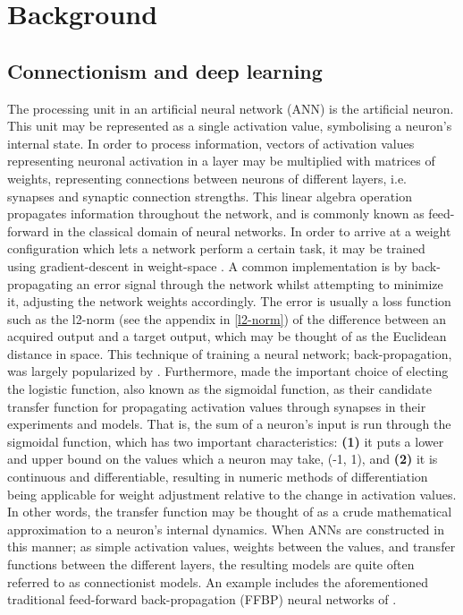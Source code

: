 
\chapter{Background}\label{chpt:background}

\section{Connectionism and deep learning}
The processing unit in an artificial neural network (ANN) is the artificial neuron. This unit may be represented as a single activation value, symbolising a neuron's internal state. In order to process information, vectors of activation values representing neuronal activation in a layer may be multiplied with matrices of weights, representing connections between neurons of different layers, i.e. synapses and synaptic connection strengths. This linear algebra operation propagates information throughout the network, and is commonly known as feed-forward in the classical domain of neural networks. In order to arrive at a weight configuration which lets a network perform a certain task, it may be trained using gradient-descent in weight-space \citep{Hinton1989}. A common implementation is by  back-propagating an error signal through the network whilst attempting to minimize it, adjusting the network weights accordingly. The error is usually a loss function such as the l2-norm (see the appendix in \ref{l2-norm}) of the difference between an acquired output and a target output, which may be thought of as the Euclidean distance in space. This technique of training a neural network; back-propagation, was largely popularized by \cite{Rumelhart1986}. Furthermore, \cite{Rumelhart1986} made the important choice of electing the logistic function, also known as the sigmoidal function, as their candidate transfer function for propagating activation values through synapses in their experiments and models. That is, the sum of a neuron's input is run through the sigmoidal function, which has two important characteristics: \textbf{(1)} it puts a lower and upper bound on the values which a neuron may take, (-1, 1), and \textbf{(2)} it is continuous and differentiable, resulting in numeric methods of differentiation being applicable for weight adjustment relative to the change in activation values. In other words, the transfer function may be thought of as a crude mathematical approximation to a neuron's internal dynamics.
When ANNs are constructed in this manner; as simple activation values, weights between the values, and transfer functions between the different layers, the resulting models are quite often referred to as connectionist models. An example includes the aforementioned traditional feed-forward back-propagation (FFBP) neural networks of \citep{Rumelhart1986}.

